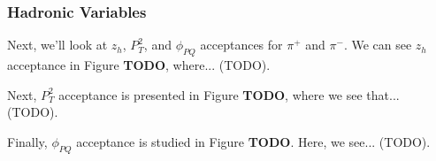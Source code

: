 \subsubsection{Hadronic Variables}
\label{14.22::hadronic_variables}
    Next, we'll look at $z_h$, $P_T^2$, and $\phi_{PQ}$ acceptances for $\pi^+$ and $\pi^-$.
    We can see $z_h$ acceptance in Figure \textbf{TODO}, where... (TODO).

    Next, $P_T^2$ acceptance is presented in Figure \textbf{TODO}, where we see that... (TODO).

    Finally, $\phi_{PQ}$ acceptance is studied in Figure \textbf{TODO}.
    Here, we see... (TODO).
